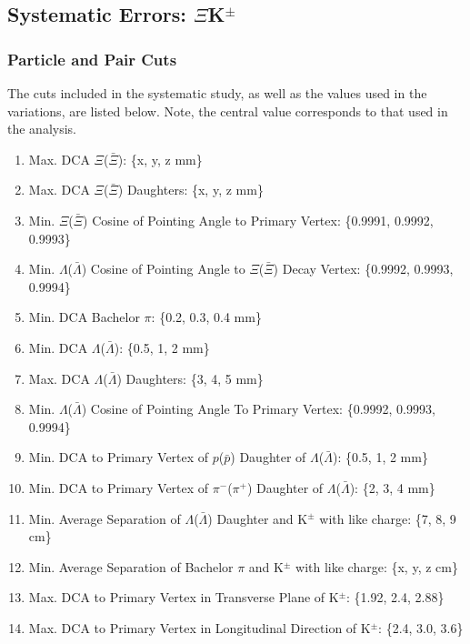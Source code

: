 \documentclass[../AnalysisNoteJBuxton.tex]{subfiles}
\begin{document}
\subsection{Systematic Errors: \texorpdfstring{$\Xi$K$^{\pm}$}{TEXT}}
\label{SysErrsXiKch}

\subsubsection{Particle and Pair Cuts}
\label{SysErrsXiKch:ParticleAndPairCuts}

The cuts included in the systematic study, as well as the values used in the variations, are listed below.  Note, the central value corresponds to that used in the analysis.

\begin{enumerate}
 \item Max. DCA $\Xi$($\bar{\Xi}$): \{x, y, z mm\}
 \item Max. DCA $\Xi$($\bar{\Xi}$) Daughters: \{x, y, z mm\}
 \item Min. $\Xi$($\bar{\Xi}$) Cosine of Pointing Angle to Primary Vertex: \{0.9991, 0.9992, 0.9993\} 
 \item Min. $\Lambda$($\bar{\Lambda}$) Cosine of Pointing Angle to $\Xi$($\bar{\Xi}$) Decay Vertex: \{0.9992, 0.9993, 0.9994\} 
 \item Min. DCA Bachelor $\pi$: \{0.2, 0.3, 0.4 mm\}
 \item Min. DCA $\Lambda$($\bar{\Lambda}$): \{0.5, 1, 2 mm\}
 \item Max. DCA $\Lambda$($\bar{\Lambda}$) Daughters: \{3, 4, 5 mm\}
 \item Min. $\Lambda$($\bar{\Lambda}$) Cosine of Pointing Angle To Primary Vertex: \{0.9992, 0.9993, 0.9994\}
 \item Min. DCA to Primary Vertex of $p$($\bar{p}$) Daughter of $\Lambda$($\bar{\Lambda}$):  \{0.5, 1, 2 mm\}
 \item Min. DCA to Primary Vertex of $\pi^{-}$($\pi^{+}$) Daughter of $\Lambda$($\bar{\Lambda}$):  \{2, 3, 4 mm\} 
 \item Min. Average Separation of $\Lambda$($\bar{\Lambda}$) Daughter and K$^{\pm}$ with like charge: \{7, 8, 9 cm\}
 \item Min. Average Separation of Bachelor $\pi$ and K$^{\pm}$ with like charge: \{x, y, z cm\}
 \item Max. DCA to Primary Vertex in Transverse Plane of K$^{\pm}$: \{1.92, 2.4, 2.88\}
 \item Max. DCA to Primary Vertex in Longitudinal Direction of K$^{\pm}$: \{2.4, 3.0, 3.6\}
\end{enumerate}
\end{document}
